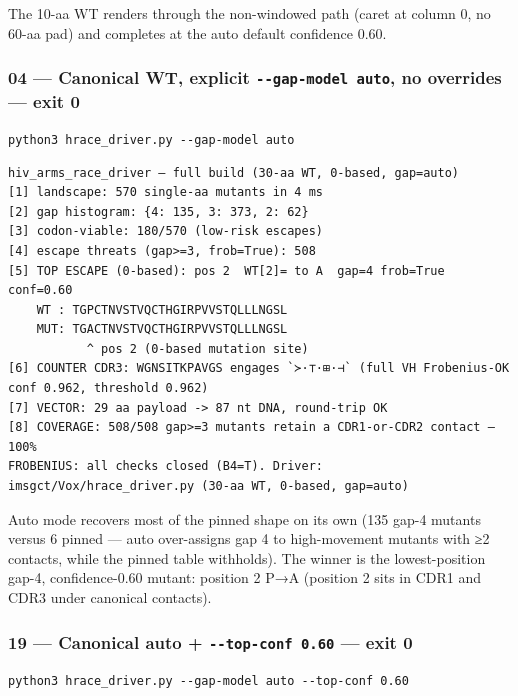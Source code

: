 \documentclass[12pt,a4paper]{article}
\begin{document}
The 10-aa WT renders through the non-windowed path (caret at column 0,
no 60-aa pad) and completes at the auto default confidence 0.60.

\hypertarget{canonical-wt-explicit---gap-model-auto-no-overrides-exit-0}{%
\subsubsection{\texorpdfstring{04 --- Canonical WT, explicit
\texttt{-\/-gap-model\ auto}, no overrides --- exit
0}{04 --- Canonical WT, explicit -\/-gap-model auto, no overrides --- exit 0}}\label{canonical-wt-explicit---gap-model-auto-no-overrides-exit-0}}

\texttt{python3\ hrace\_driver.py\ -\/-gap-model\ auto}

\begin{verbatim}
hiv_arms_race_driver — full build (30-aa WT, 0-based, gap=auto)
[1] landscape: 570 single-aa mutants in 4 ms
[2] gap histogram: {4: 135, 3: 373, 2: 62}
[3] codon-viable: 180/570 (low-risk escapes)
[4] escape threats (gap>=3, frob=True): 508
[5] TOP ESCAPE (0-based): pos 2  WT[2]= to A  gap=4 frob=True conf=0.60
    WT : TGPCTNVSTVQCTHGIRPVVSTQLLLNGSL
    MUT: TGACTNVSTVQCTHGIRPVVSTQLLLNGSL
           ^ pos 2 (0-based mutation site)
[6] COUNTER CDR3: WGNSITKPAVGS engages `≻·⊤·⊞·⊣` (full VH Frobenius-OK conf 0.962, threshold 0.962)
[7] VECTOR: 29 aa payload -> 87 nt DNA, round-trip OK
[8] COVERAGE: 508/508 gap>=3 mutants retain a CDR1-or-CDR2 contact — 100%
FROBENIUS: all checks closed (B4=T). Driver: imsgct/Vox/hrace_driver.py (30-aa WT, 0-based, gap=auto)
\end{verbatim}

Auto mode recovers most of the pinned shape on its own (135 gap-4
mutants versus 6 pinned --- auto over-assigns gap 4 to high-movement
mutants with ≥2 contacts, while the pinned table withholds). The winner
is the lowest-position gap-4, confidence-0.60 mutant: position 2 P→A
(position 2 sits in CDR1 and CDR3 under canonical contacts).

\hypertarget{canonical-auto---top-conf-0.60-exit-0}{%
\subsubsection{\texorpdfstring{19 --- Canonical auto +
\texttt{-\/-top-conf\ 0.60} --- exit
0}{19 --- Canonical auto + -\/-top-conf 0.60 --- exit 0}}\label{canonical-auto---top-conf-0.60-exit-0}}

\texttt{python3\ hrace\_driver.py\ -\/-gap-model\ auto\ -\/-top-conf\ 0.60}
\end{document}
